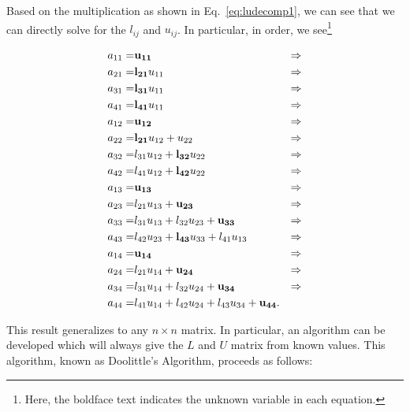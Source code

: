 \documentclass[12pt]{article}
\numberwithin{equation}{section}
\begin{document}
\noindent Based on the multiplication as shown in Eq.~\ref{eq:ludecomp1}, we can see that we can directly solve for the $l_{ij}$ and $u_{ij}$.  In particular, in order, we see\footnote{Here, the boldface text indicates the unknown variable in each equation.}

\begin{equation}
\begin{align}
a_{11} =& {\bf u_{11}} &\Rightarrow \\
a_{21} =& {\bf l_{21}} u_{11} &\Rightarrow \\
a_{31} =& {\bf l_{31}}u_{11} &\Rightarrow \\
a_{41} =& {\bf l_{41}}u_{11} &\Rightarrow \\
a_{12} =& {\bf u_{12}} &\Rightarrow \\
a_{22} =& {\bf l_{21}}u_{12}+u_{22} &\Rightarrow \\
a_{32} =& l_{31}u_{12}+{\bf l_{32}}u_{22} &\Rightarrow \\
a_{42} =& l_{41}u_{12}+{\bf l_{42}}u_{22} &\Rightarrow \\
a_{13} =& {\bf u_{13}} &\Rightarrow \\
a_{23} =& l_{21}u_{13}+{\bf u_{23}} &\Rightarrow \\
a_{33} =& l_{31}u_{13}+l_{32}u_{23}+{\bf u_{33}} &\Rightarrow \\
a_{43} =& l_{42}u_{23}+{\bf l_{43}}u_{33}+l_{41}u_{13} &\Rightarrow \\
a_{14} =& {\bf u_{14}} &\Rightarrow \\
a_{24} =& l_{21}u_{14}+{\bf u_{24}} &\Rightarrow \\
a_{34} =& l_{31}u_{14}+l_{32}u_{24}+{\bf u_{34}} &\Rightarrow \\
a_{44} =& l_{41}u_{14}+l_{42}u_{24}+l_{43}u_{34}+{\bf u_{44}}. &
\end{align}
\end{equation}

\noindent This result generalizes to any $n\times n$ matrix.  In particular, an algorithm can be developed which will always give the $L$ and $U$ matrix from known values.  This algorithm, known as Doolittle's Algorithm, proceeds as follows:
\end{document}
